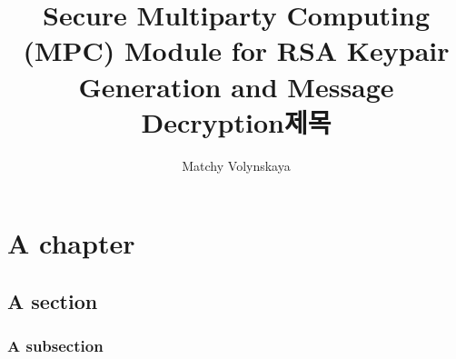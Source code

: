 \documentclass[11pt]{report}
\title{Secure Multiparty Computing (MPC) Module for RSA Keypair Generation and Message Decryption}
\title*{제목}
\author{Matchy Volynskaya}
\begin{document}


\pagebreak



\pagebreak



\pagebreak

\tableofcontents

\pagebreak

\chapter{A chapter}

\section{A section}

\subsection{A subsection}

\pagebreak


\end{document}
